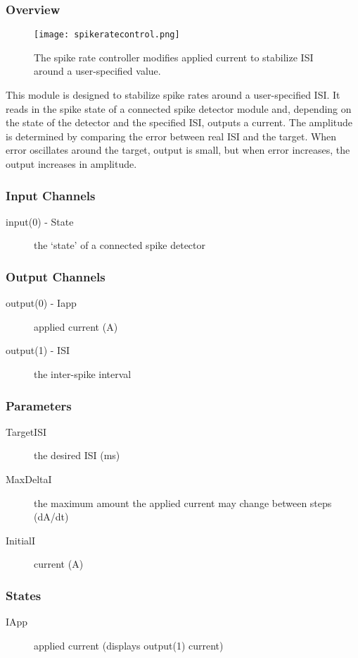 \subsubsection{Overview}
\label{Spike Rate Control}
\begin{figure}[h]
\begin{center}
\texttt{[image: spikeratecontrol.png]} 
\caption[Spike Rate Control]{The spike rate controller modifies applied current to stabilize ISI around a user-specified value.} 
\end{center}
\label{spikeratecontrol}
\end{figure}

This module is designed to stabilize spike rates around a user-specified ISI. It reads in the spike state of a connected spike detector module and, depending on the state of the detector and the specified ISI, outputs a current. The amplitude is determined by comparing the error between real ISI and the target. When error oscillates around the target, output is small, but when error increases, the output increases in amplitude. 

\subsubsection{Input Channels}
\begin{description}
\item[input(0) - State] the `state' of a connected spike detector
\end{description}

\subsubsection{Output Channels}
\begin{description}
\item[output(0) - Iapp] applied current (A)
\item[output(1) - ISI] the inter-spike interval 
\end{description}

\subsubsection{Parameters}
\begin{description}
\item[TargetISI] the desired ISI (ms)
\item[MaxDeltaI] the maximum amount the applied current may change between steps (dA/dt)
\item[InitialI] current (A)
\end{description}

\subsubsection{States}
\begin{description}
\item[IApp] applied current (displays output(1) current)
\end{description}